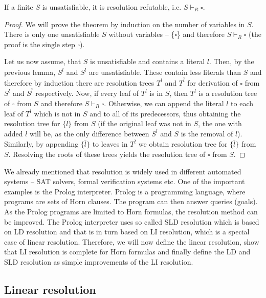 \begin{theorem}
If a finite $S$ is unsatisfiable, it is resolution refutable, i.e. $S \vdash_R \square$.
\end{theorem}
\begin{proof}
We will prove the theorem by induction on the number of variables in $S$. There is only one unsatisfiable $S$ without variables -- \{$\square$\} and therefore $S \vdash_R \square$ (the proof is the single step $\square$).

Let us now assume, that $S$ is unsatisfiable and contains a literal $l$. Then, by the previous lemma, $S^l$ and $S^{\bar{l}}$ are unsatisfiable. These contain less literals than $S$ and therefore by induction there are resolution trees $T^l$ and $T^{\bar{l}}$ for derivation of $\square$ from $S^l$ and $S^{\bar{l}}$ respectively. Now, if every leaf of $T^l$ is in $S$, then $T^l$ is a resolution tree of $\square$ from $S$ and therefore $S \vdash_R \square$. Otherwise, we can append the literal $l$ to each leaf of $T^l$ which is not in $S$ and to all of its predecessors, thus obtaining the resolution tree for $\{l\}$ from $S$ (if the original leaf was not in $S$, the one with added $l$ will be, as the only difference between $S^l$ and $S$ is the removal of $l$). Similarly, by appending $\{\bar{l}\}$ to leaves in $T^{\bar{l}}$ we obtain resolution tree for $\{\bar{l}\}$ from $S$. Resolving the roots of these trees yields the resolution tree of $\square$ from $S$.
\end{proof}

We already mentioned that resolution is widely used in different automated systems -- SAT solvers, formal verification systems etc. One of the important examples is the Prolog interpreter. Prolog is a programming language, where programs are sets of Horn clauses. The program can then answer queries (goals). As the Prolog programs are limited to Horn formulas, the resolution method can be improved. The Prolog interpreter uses so called SLD resolution which is based on LD resolution and that is in turn based on LI resolution, which is a special case of linear resolution. Therefore, we will now define the linear resolution, show that LI resolution is complete for Horn formulas and finally define the LD and SLD resolution as simple improvements of the LI resolution.

\subsection{Linear resolution}


